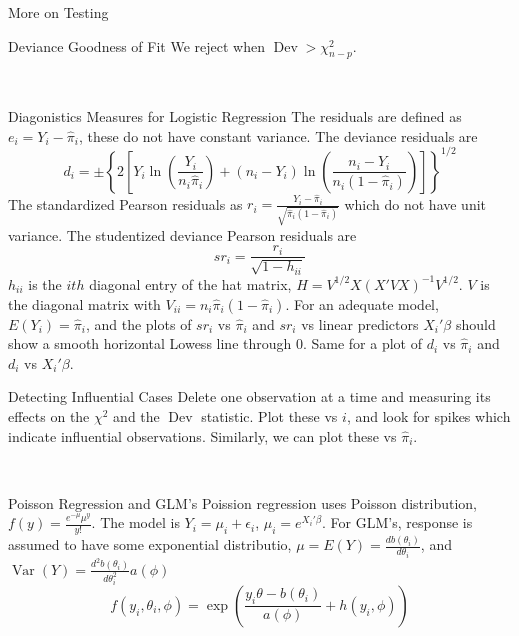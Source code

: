 \documentclass{article}
\DeclareMathOperator{\Var}{Var}
\DeclareMathOperator{\dev}{Dev}
\begin{document}
\begin{multicols*}{3}
\begin{blackbox}{More on Testing}
\begin{pinkbox}{Deviance Goodness of Fit}
                We reject when $\dev > \chi^2_{n-p}$.
            \end{pinkbox}\\[-2ex]
        \end{blackbox}
        \begin{blackbox}{Diagonistics Measures for Logistic Regression}
            The residuals are defined as $e_i = Y_i - \hat{\pi}_i$, these do not have constant variance. The deviance residuals are \\[-3ex] 
            \[d_i = \pm \left\{2\left[Y_i \ln\left(\frac{Y_i}{n_i\hat{\pi}_i}\right) + (n_i-Y_i)\ln\left(\frac{n_i-Y_i}{n_i(1-\hat{\pi}_i)}\right)\right]\right\}^{1/2}\]
            The standardized Pearson residuals as $r_i = \frac{Y_i - \hat{\pi}_i}{\sqrt{\hat{\pi}_i (1- \hat{\pi}_i)}}$
            which do not have unit variance. The studentized deviance Pearson residuals are\\[-3ex]
            \[sr_i = \frac{r_i}{\sqrt{1-h_{ii}}}\]
            $h_{ii}$ is the $ith$ diagonal entry of the hat matrix, $H = V^{1/2}X(X'VX)^{-1}V^{1/2}$. $V$ is the diagonal matrix with $V_{ii} = n_i\hat{\pi}_i(1-\hat{\pi}_i)$. 
            For an adequate model, $E(Y_i) = \hat{\pi}_i$, and the plots of $sr_i$ vs $\hat{\pi}_i$ and $sr_i$ vs linear predictors $X_i'\beta$ should show a smooth horizontal Lowess line through 0. Same for a plot of $d_i$ vs $\hat{\pi}_i$ and $d_i$ vs $X_i'\beta$.

            \begin{pinkbox}{Detecting Influential Cases}
                Delete one observation at a time and measuring its effects on the $\chi^2$ and the $\dev$ statistic. Plot these vs $i$, and look for spikes which indicate influential observations. Similarly, we can plot these vs $\hat{\pi}_i$.
            \end{pinkbox}\\[-2ex]
        \end{blackbox}
        \begin{blackbox}{Poisson Regression and GLM's}
            Poission regression uses Poisson distribution, $f(y) = \frac{e^{-\mu}\mu^y}{y!}$.
            The model is $Y_i = \mu_i + \epsilon_i$, $\mu_i = e^{X_i'
            \beta}$. For GLM's, response is assumed to have some exponential distributio, $\mu = E(Y) = \frac{db(\theta_i)}{d\theta_i}$, and $\Var(Y) = \frac{d^2b(\theta_i)}{d\theta_i^2}a(\phi)$ \\[-2ex]
            \[f(y_i, \theta_i, \phi) = \exp\left(\frac{y_i\theta - b(\theta_i)}{a(\phi)} + h(y_i, \phi)\right)\]
        \end{blackbox}
    \end{multicols*}
    
\end{document}
